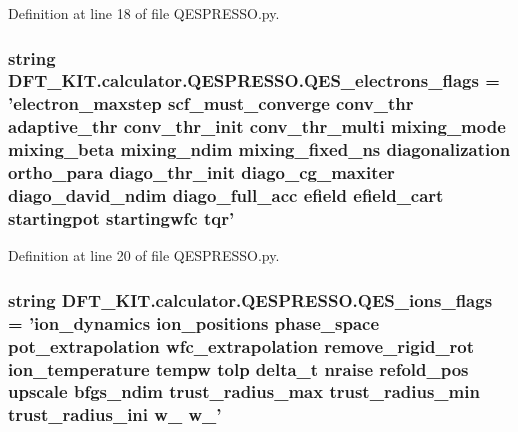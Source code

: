 Definition at line 18 of file Q\+E\+S\+P\+R\+E\+S\+S\+O.\+py.

\hypertarget{namespace_d_f_t___k_i_t_1_1calculator_1_1_q_e_s_p_r_e_s_s_o_a36e40202edc11d7e727685fe0f5661f0}{
\subsubsection[{Q\+E\+S\+\_\+electrons\+\_\+flags}]{\setlength{\rightskip}{0pt plus 5cm}string D\+F\+T\+\_\+\+K\+I\+T.\+calculator.\+Q\+E\+S\+P\+R\+E\+S\+S\+O.\+Q\+E\+S\+\_\+electrons\+\_\+flags = 'electron\+\_\+maxstep scf\+\_\+must\+\_\+converge conv\+\_\+thr adaptive\+\_\+thr conv\+\_\+thr\+\_\+init conv\+\_\+thr\+\_\+multi mixing\+\_\+mode mixing\+\_\+beta mixing\+\_\+ndim mixing\+\_\+fixed\+\_\+ns diagonalization ortho\+\_\+para diago\+\_\+thr\+\_\+init diago\+\_\+cg\+\_\+maxiter diago\+\_\+david\+\_\+ndim diago\+\_\+full\+\_\+acc efield efield\+\_\+cart startingpot startingwfc tqr'}}\label{namespace_d_f_t___k_i_t_1_1calculator_1_1_q_e_s_p_r_e_s_s_o_a36e40202edc11d7e727685fe0f5661f0}


Definition at line 20 of file Q\+E\+S\+P\+R\+E\+S\+S\+O.\+py.

\hypertarget{namespace_d_f_t___k_i_t_1_1calculator_1_1_q_e_s_p_r_e_s_s_o_af16e80a77f76ffc37d94100867ed5eab}{
\subsubsection[{Q\+E\+S\+\_\+ions\+\_\+flags}]{\setlength{\rightskip}{0pt plus 5cm}string D\+F\+T\+\_\+\+K\+I\+T.\+calculator.\+Q\+E\+S\+P\+R\+E\+S\+S\+O.\+Q\+E\+S\+\_\+ions\+\_\+flags = 'ion\+\_\+dynamics ion\+\_\+positions phase\+\_\+space pot\+\_\+extrapolation wfc\+\_\+extrapolation remove\+\_\+rigid\+\_\+rot ion\+\_\+temperature tempw tolp delta\+\_\+t nraise refold\+\_\+pos upscale bfgs\+\_\+ndim trust\+\_\+radius\+\_\+max trust\+\_\+radius\+\_\+min trust\+\_\+radius\+\_\+ini w\+\_ w\+\_'}}\label{namespace_d_f_t___k_i_t_1_1calculator_1_1_q_e_s_p_r_e_s_s_o_af16e80a77f76ffc37d94100867ed5eab}


